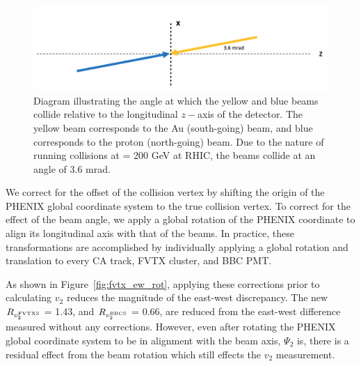 \begin{figure}[!ht]
\centering
\includegraphics[width=0.75\linewidth]{figs/beam_angle.png}
\caption{Diagram illustrating the angle at which the yellow and blue beams collide relative to the longitudinal $z-$axis of the detector. The yellow beam corresponds to the Au (south-going) beam, and blue corresponds to the proton (north-going) beam. Due to the nature of running \pau collisions at \sqsn = 200 GeV at RHIC, the beams collide at an angle of 3.6 mrad.}
\label{fig:diagram2}
\end{figure}

We correct for the offset of the collision vertex by shifting the origin of the PHENIX global coordinate system to the true collision vertex. To correct for the effect of the beam angle, we apply a global rotation of the PHENIX coordinate to align its longitudinal axis with that of the beams. In practice, these transformations are accomplished by individually applying a global rotation and translation to every CA track, FVTX cluster, and BBC PMT. 

As shown in Figure~\ref{fig:fvtx_ew_rot}, applying these corrections prior to calculating $v_2$ reduces the magnitude of the east-west discrepancy. The new $R_{v_2^{\rm FVTXS}}$ = 1.43, and $R_{v_2^{\rm BBCS}}$ = 0.66, are reduced from the east-west difference measured without any corrections. However, even after rotating the PHENIX global coordinate system to be in alignment with the beam axis, $\Psi_2$ is, there is a residual effect from the beam rotation which still effects the $v_2$ measurement. 

